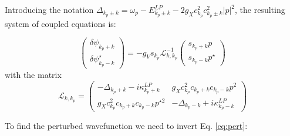 \documentclass[a4paper,prb,10pt,aps,twocolumn]{revtex4-1}
\begin{document}
Introducing the notation $\Delta_{k_{p}\pm k}=\omega_{p}-E_{k_{p}\pm k}^{LP}-2g_{X}c_{k_{p}}^{2}c_{k_{p}\pm k}^{2}|p|^{2}$, the resulting system of coupled equations is:



\begin{equation}
  \label{eq:pert}
\left(\begin{array}{c}
\delta\psi_{k_{p}+k}\\
\delta\psi_{k_{p}-k}^{\star}
\end{array}\right)=-g_{V}s_{k_{p}}\mathcal{L}_{k,k_{p}}^{-1}\left(\begin{array}{c}
s_{k_{p}+k}p\\
s_{k_{p}-k}p^{\star}
\end{array}\right)  
\end{equation}
with the matrix
\begin{equation}
  \label{eq:74}
  \mathcal{L}_{k,k_{p}}=\left(\begin{array}{cc}
-\Delta_{k_{p}+k}-i\kappa_{k_{p}+k}^{LP} & g_{X}c_{k_{p}}^{2}c_{k_{p}+k}c_{k_{p}-k}p^{2}\\
g_{X}c_{k_{p}}^{2}c_{k_{p}+k}c_{k_{p}-k}p^{\star2} & -\Delta_{k_{p}-k}+i\kappa_{k_{p}-k}^{LP}
\end{array}\right)
\end{equation}




To find the perturbed wavefunction we need to invert Eq. \ref{eq:pert}:
\end{document}
